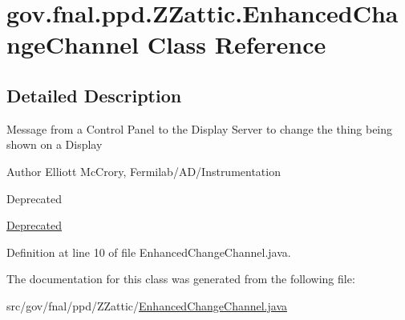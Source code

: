 \hypertarget{classgov_1_1fnal_1_1ppd_1_1ZZattic_1_1EnhancedChangeChannel}{\section{gov.\-fnal.\-ppd.\-Z\-Zattic.\-Enhanced\-Change\-Channel Class Reference}
\label{classgov_1_1fnal_1_1ppd_1_1ZZattic_1_1EnhancedChangeChannel}
}


\subsection{Detailed Description}
Message from a Control Panel to the Display Server to change the thing being shown on a Display

\begin{DoxyAuthor}{Author}
Elliott Mc\-Crory, Fermilab/\-A\-D/\-Instrumentation 
\end{DoxyAuthor}
\begin{DoxyRefDesc}{Deprecated}
\item[\hyperlink{deprecated__deprecated000014}{Deprecated}]\end{DoxyRefDesc}


Definition at line 10 of file Enhanced\-Change\-Channel.\-java.



The documentation for this class was generated from the following file\-:\begin{DoxyCompactItemize}
\item 
src/gov/fnal/ppd/\-Z\-Zattic/\hyperlink{EnhancedChangeChannel_8java}{Enhanced\-Change\-Channel.\-java}\end{DoxyCompactItemize}
